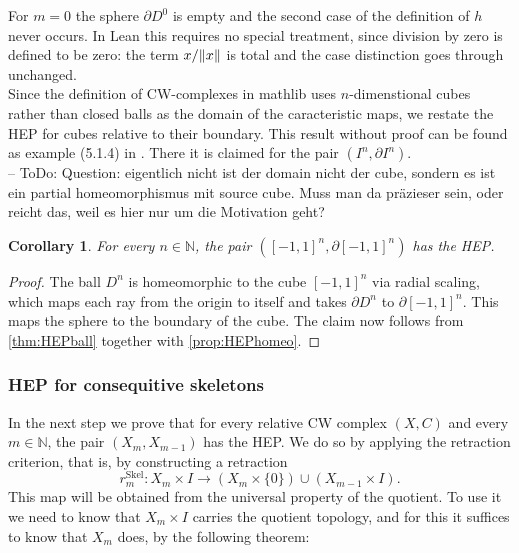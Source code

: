 \documentclass[11pt, a4paper, english]{article}
\DeclarePairedDelimiter\norm{\lVert}{\rVert}
\theoremstyle{plain}
\newtheorem{corollary}[theorem]{Corollary}
\theoremstyle{definition}
\theoremstyle{remark}
\numberwithin{equation}{section}
\numberwithin{theorem}{section}
\begin{document}
For $m = 0$ the sphere $\partial D^0$ is empty and the second case of the definition of $h$ never occurs. In Lean this requires no special treatment, since division by zero is defined to be zero: the term $x / \norm{x}$ is total and the case distinction goes through unchanged. \\
Since the definition of CW-complexes in mathlib uses $n$-dimenstional cubes rather than closed balls as the domain of the caracteristic maps, we restate the HEP for cubes relative to their boundary. This result without proof can be found as example (5.1.4) in \cite{Tammo}. There it is claimed for the pair $(I^n, \partial I^n)$. \\
-- ToDo: Question: eigentlich nicht ist der domain nicht der cube, sondern es ist ein partial homeomorphismus mit source cube. Muss man da präzieser sein, oder reicht das, weil es hier nur um die Motivation geht? \\

\begin{corollary} \label{cor:HEPcube}
    For every $ n \in \mathbb{N}$, the pair $([ - 1 ,1 ]^n , \partial [- 1 ,1 ]^n ) $ has the HEP. 
\end{corollary}
\begin{proof}
    The ball $D^n$ is homeomorphic to the cube $[-1,1]^n$ via radial scaling, which maps each ray from the origin to itself and takes $\partial D^n$ to $\partial [-1,1]^n$. This maps the sphere to the boundary of the cube. The claim now follows from \cref{thm:HEPball} together with \cref{prop:HEPhomeo}.
\end{proof}

\subsubsection{HEP for consequitive skeletons} \label{subsubsec:HEP_skel}
In the next step we prove that for every relative CW complex $(X,C)$ and every $m \in \mathbb{N}$, the pair $(X_m,X_{m-1})$ has the HEP. We do so by applying the retraction criterion, that is, by constructing a retraction 
\[ r^{\mathrm{Skel}}_m \colon X_m \times I \to (X_m \times \{0\}) \cup (X_{m-1} \times I). \] 
This map will be obtained from the universal property of the quotient. To use it we need to know that $X_m \times I$ carries the quotient topology, and for this it suffices to know that $X_m$ does, by the following theorem: 
\end{document}
